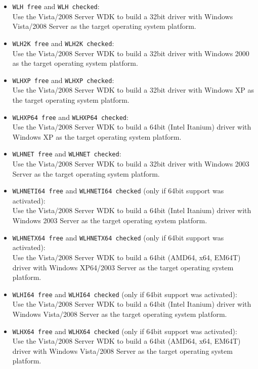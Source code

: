 \documentclass[a4paper,titlepage]{report}
\newcommand{\solcfg}[2]{\texttt{#1 free} and \texttt{#1 checked}:\\#2}
\newcommand{\solcfgsixfour}[2]{\texttt{#1 free} and \texttt{#1 checked} \textcolor[gray]{0.40}{\textsf{\small(only if 64bit support was activated)}}:\\#2}
\begin{document}
\begin{itemize}
  \item \solcfg{WLH}{Use the Vista/2008 Server WDK to build a 32bit driver with Windows Vista/2008 Server as the target operating system platform.}
  \item \solcfg{WLH2K}{Use the Vista/2008 Server WDK to build a 32bit driver with Windows 2000 as the target operating system platform.}
  \item \solcfg{WLHXP}{Use the Vista/2008 Server WDK to build a 32bit driver with Windows XP as the target operating system platform.}
  \item \solcfg{WLHXP64}{Use the Vista/2008 Server WDK to build a 64bit (Intel Itanium) driver with Windows XP as the target operating system platform.}
  \item \solcfg{WLHNET}{Use the Vista/2008 Server WDK to build a 32bit driver with Windows 2003 Server as the target operating system platform.}
  \item \solcfgsixfour{WLHNETI64}{Use the Vista/2008 Server WDK to build a 64bit (Intel Itanium) driver with Windows 2003 Server as the target operating system platform.}
  \item \solcfgsixfour{WLHNETX64}{Use the Vista/2008 Server WDK to build a 64bit (AMD64, x64, EM64T) driver with Windows XP64/2003 Server as the target operating system platform.}
  \item \solcfgsixfour{WLHI64}{Use the Vista/2008 Server WDK to build a 64bit (Intel Itanium) driver with Windows Vista/2008 Server as the target operating system platform.}
  \item \solcfgsixfour{WLHX64}{Use the Vista/2008 Server WDK to build a 64bit (AMD64, x64, EM64T) driver with Windows Vista/2008 Server as the target operating system platform.}


\end{itemize}
\end{document}

